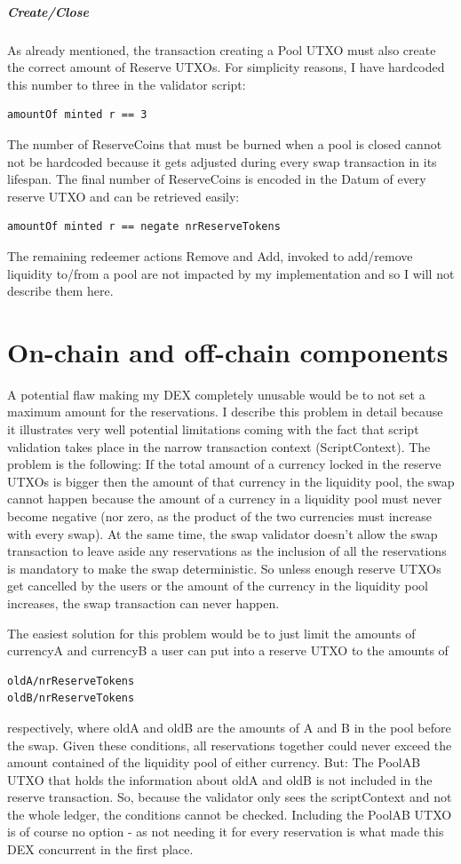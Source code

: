 \documentclass[a4paper,twoside,12pt]{report}
\begin{document}
\paragraph{Create/Close}
As already mentioned, the transaction creating a Pool UTXO must also create the correct amount of Reserve UTXOs. For simplicity reasons, I have hardcoded this number to three in the validator script:
\begin{verbatim}
amountOf minted r == 3    
\end{verbatim}
The number of ReserveCoins that must be burned when a pool is closed cannot not be hardcoded because it gets adjusted during every swap transaction in its lifespan. The final number of ReserveCoins is encoded in the Datum of every reserve UTXO and can be retrieved easily: 
\begin{verbatim}
amountOf minted r == negate nrReserveTokens    
\end{verbatim}

The remaining redeemer actions Remove and Add, invoked to add/remove liquidity to/from a pool are not impacted by my implementation and so I will not describe them here.

\chapter{On-chain and off-chain components}
A potential flaw making my DEX completely unusable would be to not set a maximum amount for the reservations. I describe this problem in detail because it illustrates very well potential limitations coming with the fact that script validation takes place in the narrow transaction context (ScriptContext). The problem is the following: If the total amount of a currency locked in the reserve UTXOs is bigger then the amount of that currency in the liquidity pool, the swap cannot happen because the amount of a currency in a liquidity pool must never become negative (nor zero, as the product of the two currencies must increase with every swap). At the same time, the swap validator doesn't allow the swap transaction to leave aside any reservations as the inclusion of all the reservations is mandatory to make the swap deterministic. So unless enough reserve UTXOs get cancelled by the users or the amount of the currency in the liquidity pool increases, the swap transaction can never happen.

The easiest solution for this problem would be to just limit the amounts of currencyA and currencyB a user can put into a reserve UTXO to the amounts of
\begin{verbatim}
oldA/nrReserveTokens
oldB/nrReserveTokens
\end{verbatim}
respectively, where oldA and oldB are the amounts of A and B in the pool before the swap. Given these conditions, all reservations together could never exceed the amount contained of the liquidity pool of either currency. But: The PoolAB UTXO that holds the information about oldA and oldB is not included in the reserve transaction. So, because the validator only sees the scriptContext and not the whole ledger, the conditions cannot be checked. Including the PoolAB UTXO is of course no option - as not needing it for every reservation is what made this DEX concurrent in the first place. 
\end{document}
